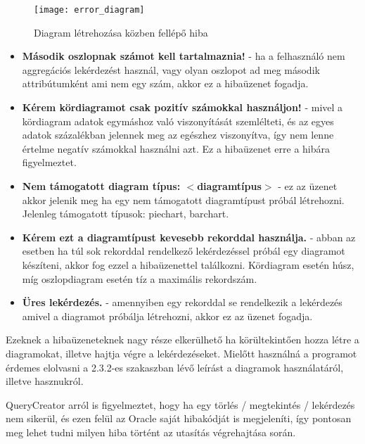 \begin{figure}[ht]
  \begin{center}
  \texttt{[image: error\_diagram]}
  \end{center}
 \caption{Diagram létrehozása közben fellépő hiba}
\end{figure}

\begin{itemize}
  \item \textbf{Második oszlopnak számot kell tartalmaznia!} - ha a felhasználó nem aggregációs lekérdezést használ, vagy olyan oszlopot ad meg második attribútumként ami nem egy
  szám, akkor ez a hibaüzenet fogadja.
  \item \textbf{Kérem kördiagramot csak pozitív számokkal használjon!} - mivel a kördiagram adatok egymáshoz való viszonyítását szemlélteti, és az egyes adatok százalékban jelennek meg
  az egészhez viszonyítva, így nem lenne értelme negatív számokkal használni azt. Ez a hibaüzenet erre a hibára figyelmeztet.
  \item \textbf{Nem támogatott diagram típus: $<$diagramtípus$>$} - ez az üzenet akkor jelenik meg ha egy nem támogatott diagramtípust próbál létrehozni.
  Jelenleg támogatott típusok: piechart, barchart.
  \item \textbf{Kérem ezt a diagramtípust kevesebb rekorddal használja.} - abban az esetben ha túl sok rekorddal rendelkező lekérdezéssel próbál egy diagramot készíteni, akkor
  fog ezzel a hibaüzenettel találkozni. Kördiagram esetén húsz, míg oszlopdiagram esetén tíz a maximális rekordszám.
  \item \textbf{Üres lekérdezés.} - amennyiben egy rekorddal se rendelkezik a lekérdezés amivel a diagramot próbálja létrehozni, akkor ez az üzenet fogadja.
\end{itemize}

Ezeknek a hibaüzeneteknek nagy része elkerülhető ha körültekintően hozza létre a diagramokat, illetve hajtja végre a lekérdezéseket. Mielőtt használná a programot
érdemes elolvasni a 2.3.2-es szakaszban lévő leírást a diagramok használatáról, illetve hasznukról.

QueryCreator arról is figyelmeztet, hogy ha egy törlés / megtekintés / lekérdezés nem sikerül, és ezen felül az Oracle saját hibakódját is megjeleníti, így pontosan
meg lehet tudni milyen hiba történt az utasítás végrehajtása során.
